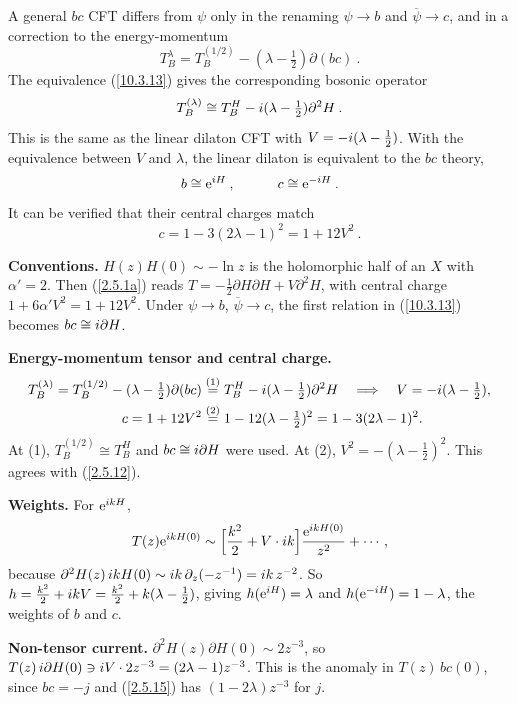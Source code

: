 	A general $bc$ CFT differs from $\psi$ only in the renaming $\psi\to b$ and $\overline{\psi}\to c$, and in a correction to the energy-momentum
	\begin{equation}
		T_{B}^{\lambda} = T_{B}^{(1/2)} - (\lambda -\tfrac{1}{2})\partial(bc) \:. \label{10.3.30}
	\end{equation}
	The equivalence (\ref{10.3.13}) gives the corresponding bosonic operator
	\begin{equation}
		T_{B}^{(\lambda)} \cong T_{B}^{H} -i (\lambda-\tfrac{1}{2})\partial^{2}H\:. \label{10.3.31}
	\end{equation}
	This is the same as the linear dilaton CFT with $V=-i(\lambda-\tfrac{1}{2})$. With the equivalence between $V$ and $\lambda$, the linear dilaton is equivalent to the $bc$ theory,
	\begin{equation}
		b \cong \mathrm{e}^{i H} \:, \qquad \quad c\cong\mathrm{e}^{-i H} \:. \label{10.3.32}
	\end{equation}
	It can be verified that their central charges match
	\begin{equation}
		c=1-3(2\lambda-1)^{2}=1+12V^{2}\:. \label{10.3.33}
	\end{equation}
	\begin{tcolorbox}[breakable]
		\begin{remark}
			\textbf{Conventions.} $H(z)H(0)\sim-\ln z$ is the holomorphic half of an $X$ with $\alpha'=2$. Then (\ref{2.5.1a}) reads $T=-\tfrac12\partial H\partial H+V\partial^{2}H$, with central charge $1+6\alpha'V^{2}=1+12V^{2}$. Under $\psi\to b$, $\overline\psi\to c$, the first relation in (\ref{10.3.13}) becomes $bc\cong i\partial H$.

			\textbf{Energy-momentum tensor and central charge.}
			\begin{align*}
				T^{(\lambda)}_B=T^{(1/2)}_B-(\lambda-\tfrac12)\partial(bc)&\overset{(1)}{=}T^{H}_B-i(\lambda-\tfrac12)\partial^{2}H\quad\Longrightarrow\quad V=-i(\lambda-\tfrac12),\\
				c=1+12V^{2}&\overset{(2)}{=}1-12(\lambda-\tfrac12)^{2}=1-3(2\lambda-1)^{2} .
			\end{align*}
			At (1), $T^{(1/2)}_B\cong T^H_B$ and $bc\cong i\partial H$ were used. At (2), $V^{2}=-(\lambda-\tfrac12)^{2}$. This agrees with (\ref{2.5.12}).

			\textbf{Weights.} For $\mathrm{e}^{i kH}$,
			\begin{equation*}
				T(z)\mathrm{e}^{i kH(0)}\sim\Bigl[\frac{k^{2}}{2}+V\cdot i k\Bigr]\frac{\mathrm{e}^{i kH(0)}}{z^{2}}+\cdots,
			\end{equation*}
			because $\partial^{2}H(z)\,i kH(0)\sim i k\,\partial_z(-z^{-1})=i k\,z^{-2}$. So $h=\tfrac{k^{2}}{2}+i kV=\tfrac{k^2}{2}+k(\lambda-\tfrac12)$, giving $h(\mathrm{e}^{i H})=\lambda$ and $h(\mathrm{e}^{-i H})=1-\lambda$, the weights of $b$ and $c$.

			\textbf{Non-tensor current.} $\partial^{2}H(z)\partial H(0)\sim2z^{-3}$, so $T(z)\,i\partial H(0)\ni i V\cdot2z^{-3}=(2\lambda-1)z^{-3}$. This is the anomaly in $T(z)\,bc(0)$, since $bc=-j$ and (\ref{2.5.15}) has $(1-2\lambda)z^{-3}$ for $j$.
		\end{remark}
	\end{tcolorbox}

